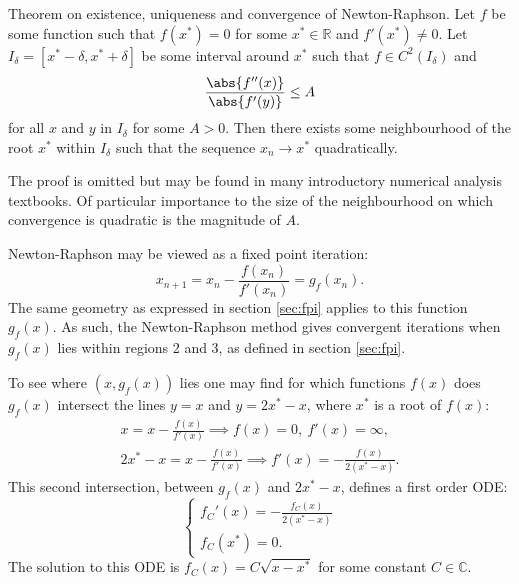 \documentclass{article}
\begin{document}
\begin{thm}
Theorem on existence, uniqueness and convergence of Newton-Raphson.
Let $f$ be some function such that $f(x^*) = 0$ for some $x^* \in \mathbb{R}$ and $f'(x^*) \neq 0$.
Let $I_\delta = [x^* - \delta, x^* + \delta]$ be some interval around $x^*$ such that $f \in C^2(I_\delta)$ and
\begin{equation*}
\frac{\abs{f''(x)}}{\abs{f'(y)}} \leq A
\end{equation*}
for all $x$ and $y$ in $I_\delta$ for some $A > 0$.
Then there exists some neighbourhood of the root $x^*$ within $I_\delta$ such that the sequence $x_n \to x^*$ quadratically.
\end{thm}

The proof is omitted but may be found in many introductory numerical analysis textbooks.
Of particular importance to the size of the neighbourhood on which convergence is quadratic is the magnitude of $A$.

Newton-Raphson may be viewed as a fixed point iteration:
\begin{equation*}
x_{n+1} = x_n - \frac{f(x_n)}{f'(x_n)} = g_f(x_n) .
\end{equation*}
The same geometry as expressed in section \ref{sec:fpi} applies to this function $g_f(x)$.
As such, the Newton-Raphson method gives convergent iterations when $g_f(x)$ lies within regions 2 and 3, as defined in section \ref{sec:fpi}.

To see where $(x, g_f(x))$ lies one may find for which functions $f(x)$ does $g_f(x)$ intersect the lines $y = x$ and $y = 2 x^* - x$, where $x^*$ is a root of $f(x)$:
\begin{align*}
x = x - \frac{f(x)}{f'(x)} \implies f(x) = 0, \ f'(x) = \infty, \\
2 x^* - x = x - \frac{f(x)}{f'(x)} \implies f'(x) = - \frac{f(x)}{2 (x^* - x)} .
\end{align*}
This second intersection, between $g_f(x)$ and $2 x^* - x$, defines a first order ODE:
\begin{equation}
\begin{cases} f_C'(x) = - \frac{f_C(x)}{2 (x^* - x)} \\ f_C(x^*) = 0 . \end{cases}
\end{equation}
The solution to this ODE is $f_C(x) = C \sqrt{x - x^*}$ for some constant $C \in \mathbb{C}$.
\end{document}
